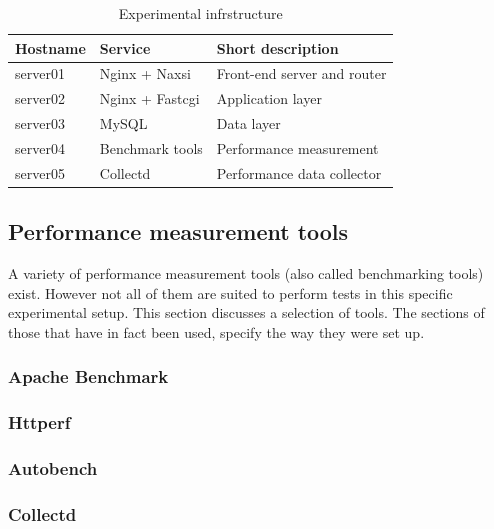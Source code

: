 \documentclass[Methods]{subfiles}
\begin{document}
\begin{table}[H]
\caption{Experimental infrstructure}
\begin{tabular}{|p{}|p{}|p{5cm}|}
\hline
\textbf{Hostname} & \textbf{Service} & \textbf{Short description} \\ \hline
server01 & Nginx + Naxsi & Front-end server and router \\ \hline
server02 & Nginx + Fastcgi & Application layer \\ \hline
server03 & MySQL & Data layer \\ \hline
server04 & Benchmark tools & Performance measurement \\ \hline
server05 & Collectd & Performance data collector \\ \hline
\end{tabular}
\label{tab:Experimental infrastructure}
\end{table}

\subsection{Performance measurement tools}
A variety of performance measurement tools (also called benchmarking tools) exist. However not all of them are suited to perform tests in this specific experimental setup. This section discusses a selection of tools. The sections of those that have in fact been used, specify the way they were set up.

\subsubsection{Apache Benchmark}


\subsubsection{Httperf}


\subsubsection{Autobench}


\subsubsection{Collectd}

\end{document}
